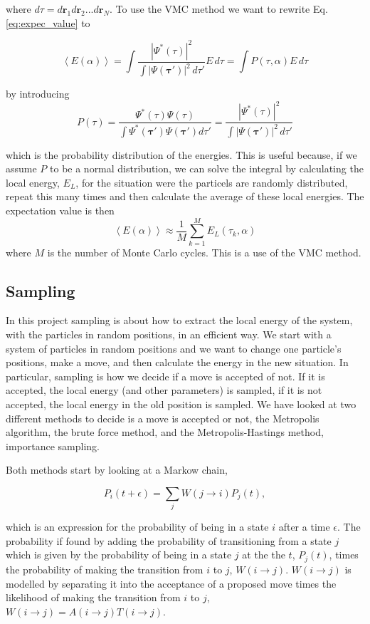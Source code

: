 where $ d\tau = d\mathbf{r}_1d\mathbf{r}_2 ... d\mathbf{r}_N$. To use the VMC method we want to rewrite Eq.  \ref{eq:expec_value} to

\begin{equation}
\left< E(\alpha) \right> = \int \frac{|\Psi^*(\tau)|^2}{\int |\Psi(\mathbf{\tau}')|^2 \,d \tau' }  E\, d\tau = \int P(\tau, \alpha) E\, d\tau
\end{equation}

by introducing 
$$P(\tau) = \frac{\Psi^*(\tau) \Psi(\tau)}{\int \Psi^*(\mathbf{\tau}')\Psi(\mathbf{\tau}') d \tau' } = \frac{|\Psi^*(\tau)|^2}{\int |\Psi(\mathbf{\tau}')|^2 \,d \tau' }$$

which is the probability distribution of the energies. This is useful because, if we assume $P$ to be a normal distribution, we can solve the integral by calculating the local energy, $E_L$, for the situation were the particels are randomly  distributed, repeat this many times and then calculate the average of these local energies. The expectation value is then 
$$ \left< E(\alpha) \right> \approx \frac{1}{M} \sum_{k=1}^M E_L(\tau_k, \alpha) $$
where $M$ is the number of Monte Carlo cycles. This is a use of the VMC method.

\subsection{Sampling}
In this project sampling is about how to extract the local energy of the system, with the particles in random positions, in an efficient way. We start with a system of particles in random positions and we want to change one particle's positions, make a move, and then calculate the energy in the new situation. In particular, sampling is how we decide if a move is accepted of not. If it is accepted, the local energy (and other parameters) is sampled, if it is not accepted, the local energy in the old position is sampled. We have looked at two different methods to decide is a move is accepted or not, the Metropolis algorithm, the brute force method, and the Metropolis-Hastings method, importance sampling. 

Both methods start by looking at a Markow chain,

$$ P_i(t+\epsilon) = \sum_j W(j\rightarrow i) P_j(t), $$

which is an expression for the probability of being in a state $i$ after a time $\epsilon$. The probability if found by adding the probability of transitioning from a state $j$ which is given by the probability of being in a state $j$ at the the $t$, $P_j(t)$, times the probability of making the transition from $i$ to $j$, $W(i\rightarrow j)$. $W(i\rightarrow j)$ is modelled by separating it into the acceptance of a proposed move times the likelihood of making the transition from $i$ to $j$, $W(i\rightarrow j) = A(i\rightarrow j)T(i\rightarrow j)$.

